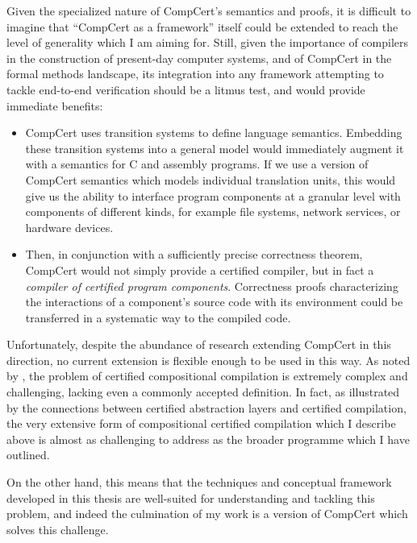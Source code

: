 \documentclass[11pt,oneside,draft]{book}
\theoremstyle{definition}
\begin{document}
Given the specialized nature
of CompCert's semantics and proofs,
it is difficult to imagine
that ``CompCert as a framework'' itself
could be extended
to reach the level of generality which I am aiming for.
Still,
given the importance of compilers in
the construction of present-day computer systems,
and of CompCert in the formal methods landscape,
its integration into any framework
attempting to tackle end-to-end verification
should be a litmus test,
and would provide immediate benefits:
\begin{itemize}
  \item
    CompCert uses transition systems to define language semantics.
    Embedding these transition systems
    into a general model
    would immediately augment it with
    a semantics for C and assembly programs.
    If we use a version of CompCert semantics
    which models individual translation units,
    this would give us the ability to
    interface program components at a granular level
    with components of different kinds,
    for example
    file systems, network services, or hardware devices.
  \item
    Then,
    in conjunction with a sufficiently precise
    correctness theorem,
    CompCert would not simply provide
    a certified compiler,
    but in fact
    a \emph{compiler of certified program components}.
    Correctness proofs characterizing
    the interactions of a component's source code with its environment
    could be transferred in a systematic way
    to the compiled code.
\end{itemize}

Unfortunately,
despite the abundance of research
extending CompCert in this direction,
no current extension is flexible enough to be used in this way.
As noted by \citet{next700},
the problem of certified compositional compilation
is extremely complex and challenging,
lacking even a commonly accepted definition.
In fact,
as illustrated by the connections between
certified abstraction layers and
certified compilation,
the very extensive form of
compositional certified compilation
which I describe above
is almost as challenging to address
as the broader programme which I have outlined.

On the other hand,
this means that the techniques and conceptual framework
developed in this thesis
are well-suited
for understanding and tackling this problem,
and indeed the culmination of my work
is a version of CompCert
which solves this challenge.

\end{document}
